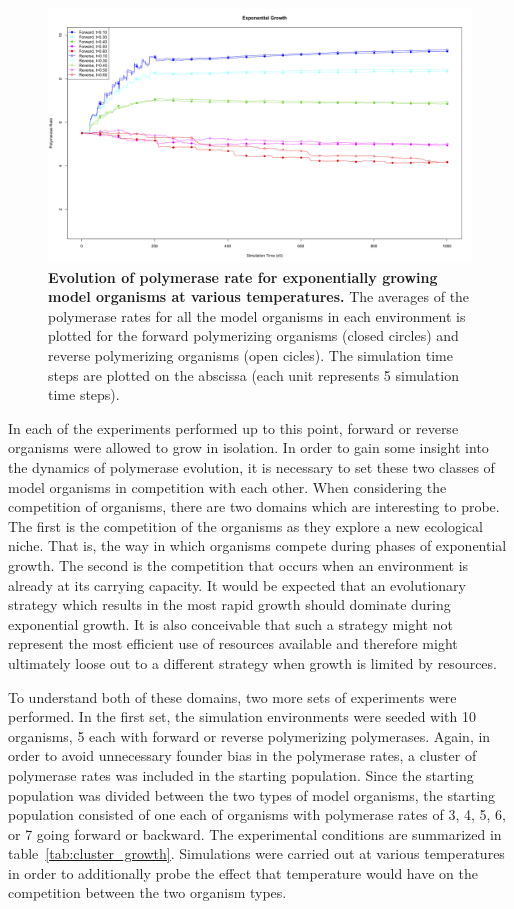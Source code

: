 \begin{figure}[h]
	\centering
		\includegraphics[width=\textwidth]{temp_incr_rate}
	\caption{\textbf{Evolution of polymerase rate for exponentially growing model organisms at various temperatures.} The averages of the polymerase rates for all the model organisms in each environment is plotted for the forward polymerizing organisms (closed circles) and reverse polymerizing organisms (open cicles). The simulation time steps are plotted on the abscissa (each unit represents 5 simulation time steps).}
	\label{fig:temp_incr_rate}
\end{figure}

In each of the experiments performed up to this point, forward or reverse organisms were allowed to grow in isolation. In order to gain some insight into the dynamics of polymerase evolution, it is necessary to set these two classes of model organisms in competition with each other. When considering the competition of organisms, there are two domains which are interesting to probe. The first is the competition of the organisms as they explore a new ecological niche. That is, the way in which organisms compete during phases of exponential growth. The second is the competition that occurs when an environment is already at its carrying capacity. It would be expected that an evolutionary strategy which results in the most rapid growth should dominate during exponential growth. It is also conceivable that such a strategy might not represent the most efficient use of resources available and therefore might ultimately loose out to a different strategy when growth is limited by resources.

To understand both of these domains, two more sets of experiments were performed. In the first set, the simulation environments were seeded with 10 organisms, 5 each with forward or reverse polymerizing polymerases. Again, in order to avoid unnecessary founder bias in the polymerase rates, a cluster of polymerase rates was included in the starting population. Since the starting population was divided between the two types of model organisms, the starting population consisted of one each of organisms with polymerase rates of 3, 4, 5, 6, or 7 going forward or backward. The experimental conditions are summarized in table~\ref{tab:cluster_growth}. Simulations were carried out at various temperatures in order to additionally probe the effect that temperature would have on the competition between the two organism types.

